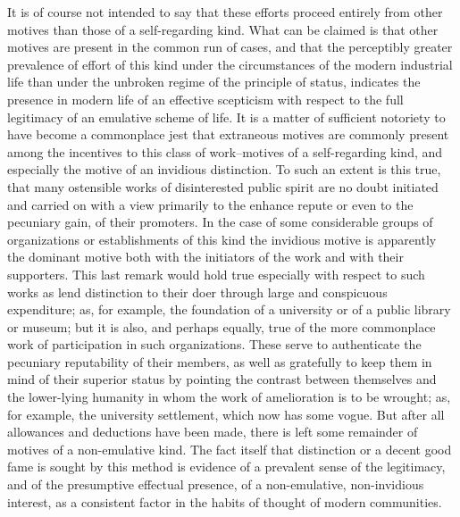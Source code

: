 \documentclass[12pt]{report}
\begin{document}
It is of course not intended to say that these efforts proceed entirely
from other motives than those of a self-regarding kind. What can be
claimed is that other motives are present in the common run of cases,
and that the perceptibly greater prevalence of effort of this kind under
the circumstances of the modern industrial life than under the unbroken
regime of the principle of status, indicates the presence in modern life
of an effective scepticism with respect to the full legitimacy of an
emulative scheme of life. It is a matter of sufficient notoriety to have
become a commonplace jest that extraneous motives are commonly present
among the incentives to this class of work--motives of a self-regarding
kind, and especially the motive of an invidious distinction. To such an
extent is this true, that many ostensible works of disinterested public
spirit are no doubt initiated and carried on with a view primarily to
the enhance repute or even to the pecuniary gain, of their promoters. In
the case of some considerable groups of organizations or establishments
of this kind the invidious motive is apparently the dominant motive both
with the initiators of the work and with their supporters. This last
remark would hold true especially with respect to such works as lend
distinction to their doer through large and conspicuous expenditure; as,
for example, the foundation of a university or of a public library
or museum; but it is also, and perhaps equally, true of the more
commonplace work of participation in such organizations. These serve
to authenticate the pecuniary reputability of their members, as well as
gratefully to keep them in mind of their superior status by pointing
the contrast between themselves and the lower-lying humanity in whom the
work of amelioration is to be wrought; as, for example, the university
settlement, which now has some vogue. But after all allowances and
deductions have been made, there is left some remainder of motives of
a non-emulative kind. The fact itself that distinction or a decent good
fame is sought by this method is evidence of a prevalent sense of
the legitimacy, and of the presumptive effectual presence, of a
non-emulative, non-invidious interest, as a consistent factor in the
habits of thought of modern communities.
\end{document}
